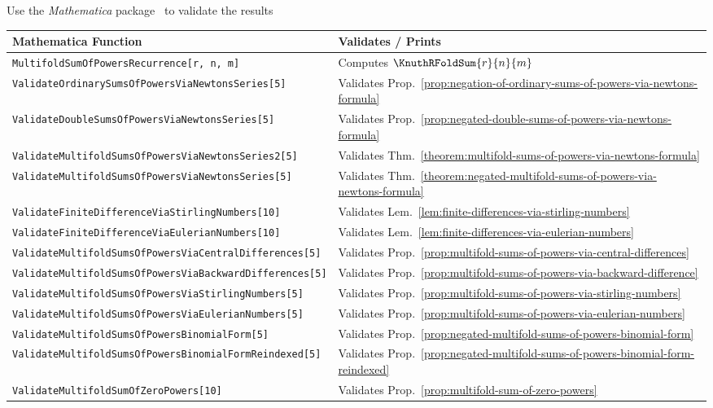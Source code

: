 Use the \textit{Mathematica} package~\cite{MathematicaPrograms}
to validate the results
\begin{center}
  \renewcommand{\arraystretch}{1.3}
  \begin{tabular}{ll}
    \toprule
    \textbf{Mathematica Function}                                   & \textbf{Validates / Prints}                                                         \\
    \midrule
    \texttt{MultifoldSumOfPowersRecurrence[r, n, m]}                & Computes $\KnuthRFoldSum{r}{n}{m}$                                                  \\
    \texttt{ValidateOrdinarySumsOfPowersViaNewtonsSeries[5]}        & Validates Prop.~\eqref{prop:negation-of-ordinary-sums-of-powers-via-newtons-formula}       \\
    \texttt{ValidateDoubleSumsOfPowersViaNewtonsSeries[5]}          & Validates Prop.~\eqref{prop:negated-double-sums-of-powers-via-newtons-formula}       \\
    \texttt{ValidateMultifoldSumsOfPowersViaNewtonsSeries2[5]}      & Validates Thm.~\eqref{theorem:multifold-sums-of-powers-via-newtons-formula}       \\
    \texttt{ValidateMultifoldSumsOfPowersViaNewtonsSeries[5]}       & Validates Thm.~\eqref{theorem:negated-multifold-sums-of-powers-via-newtons-formula}       \\
    \texttt{ValidateFiniteDifferenceViaStirlingNumbers[10]}         & Validates Lem.~\eqref{lem:finite-differences-via-stirling-numbers}                 \\
    \texttt{ValidateFiniteDifferenceViaEulerianNumbers[10]}         & Validates Lem.~\eqref{lem:finite-differences-via-eulerian-numbers}                 \\
    \texttt{ValidateMultifoldSumsOfPowersViaCentralDifferences[5]}  & Validates Prop.~\eqref{prop:multifold-sums-of-powers-via-central-differences} \\
    \texttt{ValidateMultifoldSumsOfPowersViaBackwardDifferences[5]} & Validates Prop.~\eqref{prop:multifold-sums-of-powers-via-backward-difference} \\
    \texttt{ValidateMultifoldSumsOfPowersViaStirlingNumbers[5]}     & Validates Prop.~\eqref{prop:multifold-sums-of-powers-via-stirling-numbers}    \\
    \texttt{ValidateMultifoldSumsOfPowersViaEulerianNumbers[5]}     & Validates Prop.~\eqref{prop:multifold-sums-of-powers-via-eulerian-numbers}    \\
    \texttt{ValidateMultifoldSumsOfPowersBinomialForm[5]}           & Validates Prop.~\eqref{prop:negated-multifold-sums-of-powers-binomial-form}           \\
    \texttt{ValidateMultifoldSumsOfPowersBinomialFormReindexed[5]}  & Validates Prop.~\eqref{prop:negated-multifold-sums-of-powers-binomial-form-reindexed} \\
    \texttt{ValidateMultifoldSumOfZeroPowers[10]}                   & Validates Prop.~\eqref{prop:multifold-sum-of-zero-powers} \\
    \bottomrule
  \end{tabular}
\end{center}
